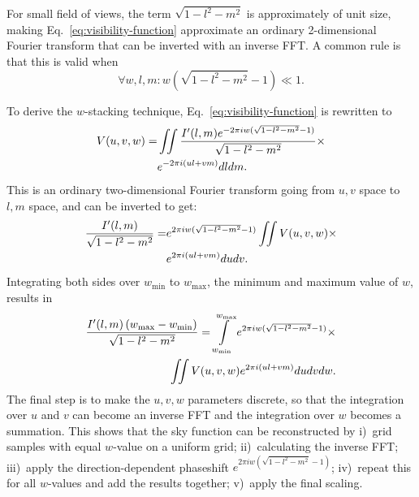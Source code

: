 \documentclass[useAMS,usenatbib]{mn2e}
\begin{document}
For small field of views, the term $\sqrt{1-l^2-m^2}$ is approximately of unit size, making Eq.~\eqref{eq:visibility-function} approximate an ordinary 2-dimensional Fourier transform that can be inverted with an inverse FFT. A common rule is that this is valid when
\begin{equation}\label{eq:when-2d-is-valid}
\forall w,l,m: w\left(\sqrt{1-l^2-m^2}-1\right) \ll 1.
\end{equation}

To derive the $w$-stacking technique, Eq.~\eqref{eq:visibility-function} is rewritten to
\begin{align}\notag
V(u,v,w) = & \iint \frac{I'(l,m) e^{-2\pi i w(\sqrt{1-l^2-m^2}-1)}}{\sqrt{1-l^2-m^2}} \times \\ \notag
& e^{-2\pi i \left(ul + vm\right)} dl dm.
\end{align}
This is an ordinary two-dimensional Fourier transform going from $u,v$ space to $l,m$ space, and can be inverted to get:
\begin{align}\notag
\frac{I'(l,m)}{\sqrt{1-l^2-m^2}} = & e^{2\pi i w(\sqrt{1-l^2-m^2}-1)} \iint V(u,v,w) \times \\ \notag
& e^{2\pi i \left(ul + vm\right)} du dv.
\end{align}
Integrating both sides over $w_{\min}$ to $w_{\max}$, the minimum and maximum value of $w$, results in
\begin{align}\notag
\frac{I'(l,m)\left(w_{\max} - w_{\min}\right)}{\sqrt{1-l^2-m^2}} = \int\limits_{w_{\min}}^{w_{\max}} e^{2\pi i w(\sqrt{1-l^2-m^2}-1)} \times \\ \label{eq:wstacking}
\iint V(u,v,w)  e^{2\pi i \left(ul + vm\right)} du dv dw.
\end{align}
The final step is to make the $u,v,w$ parameters discrete, so that the integration over $u$ and $v$ can become an inverse FFT and the integration over $w$ becomes a summation. This shows that the sky function can be reconstructed by i)~grid samples with equal $w$-value on a uniform grid; ii)~calculating the inverse FFT; iii)~apply the direction-dependent phaseshift $e^{2\pi i w(\sqrt{1-l^2-m^2}-1)}$; iv)~repeat this for all $w$-values and add the results together; v)~apply the final scaling.
\end{document}
